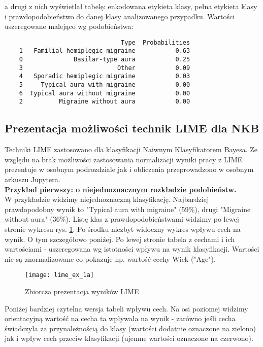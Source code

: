 a drugi z nich wyświetlał tabelę: enkodowana etykieta klasy, pełna etykieta klasy i prawdopodobieństwo do danej klasy analizowanego przypadku. Wartości uszeregowane malejąco wg podobieństwa:

\begin{verbatim}
                                Type  Probabilities
    1   Familial hemiplegic migraine           0.63
    0              Basilar-type aura           0.25
    3                          Other           0.09
    4   Sporadic hemiplegic migraine           0.03
    5     Typical aura with migraine           0.00
    6  Typical aura without migraine           0.00
    2          Migraine without aura           0.00
\end{verbatim}

\subsection{Prezentacja możliwości technik LIME dla NKB}
Techniki LIME zastosowano dla klasyfikacji Naiwnym Klasyfikatorem Bayesa. Ze względu na brak możliwości zastosowania normalizacji wyniki pracy z LIME prezentuje w osobnym podrozdziale jak i obliczenia przeprowadzono w osobnym arkuszu Jupytera.\\

\textbf{Przykład pierwszy: o niejednoznacznym rozkładzie podobieństw.}\\
\noindent W przykładzie widzimy niejednoznaczną klasyfikację. Najbardziej prawdopodobny wynik to "Typical aura with migraine" (59\%), drugi "Migraine without aura" (36\%). Listę klas z prawdopodobieństwami widzimy po lewej stronie wykresu rys. \ref{fig:lime_ex_1a}. Po środku niezbyt widoczny wykres wpływu cech na wynik. O tym szczegółowo poniżej. Po lewej stronie tabela z cechami i ich wartościami - uszeregowana wg istotności wpływu na wynik klasyfikacji. Wartości nie są znormalizowane co pokazuje np. wartość cechy Wiek ("Age").\\

\begin{figure}[H]
    \centering
    \texttt{[image: lime\_ex\_1a]}
    \caption{Zbiorcza prezentacja wyników LIME}
    \label{fig:lime_ex_1a}
\end{figure}

Poniżej bardziej czytelna wersja tabeli wpływu cech. Na osi poziomej widzimy orientacyjną wartość na cecha ta wpływała na wynik - zarówno jeśli cecha świadczyła za przynależnością do klasy (wartości dodatnie oznaczone na zielono) jak i wpływ cech przeciw klasyfikacji (ujemne wartości oznaczone na czerwono).\\

